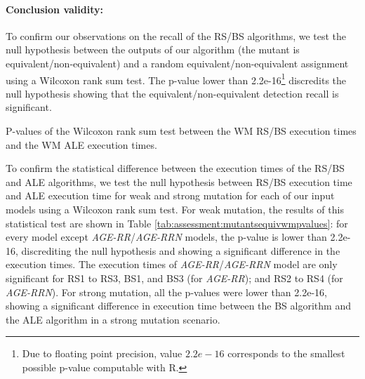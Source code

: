 %

\paragraph{Conclusion validity:}

To confirm our observations on the recall of the RS/BS algorithms, we test the null hypothesis between the outputs of our algorithm (the mutant is equivalent/non-equivalent) and a random equivalent/non-equivalent assignment using a Wilcoxon rank sum test. The p-value lower than 2.2e-16\footnote{Due to floating point precision, value $2.2e-16$ corresponds to the smallest possible p-value computable with R.} discredits the null hypothesis showing that the equivalent/non-equivalent detection recall is significant.

\begin{table}
	\centering
	\caption{P-values of the Wilcoxon rank sum test between the WM RS/BS execution times and the WM ALE execution times.}
	\label{tab:assessment:mutantsequivwmpvalues}
	
\end{table}

To confirm the statistical difference between the execution times of the RS/BS and ALE algorithms, we test the null hypothesis between RS/BS execution time and ALE execution time for weak and strong mutation for each of our input models using a Wilcoxon rank sum test. For weak mutation, the results of this statistical test are shown in Table \ref{tab:assessment:mutantsequivwmpvalues}: for every model except \textit{AGE-RR}/\textit{AGE-RRN} models, the p-value is lower than 2.2e-16, discrediting the null hypothesis and showing a significant difference in the execution times. The execution times of \textit{AGE-RR}/\textit{AGE-RRN} model are only significant for RS1 to RS3, BS1, and BS3 (for \textit{AGE-RR}); and RS2 to RS4 (for \textit{AGE-RRN}). For strong mutation, all the p-values were lower than 2.2e-16, showing a significant difference in execution time between the BS algorithm and the ALE algorithm in a strong mutation scenario.


